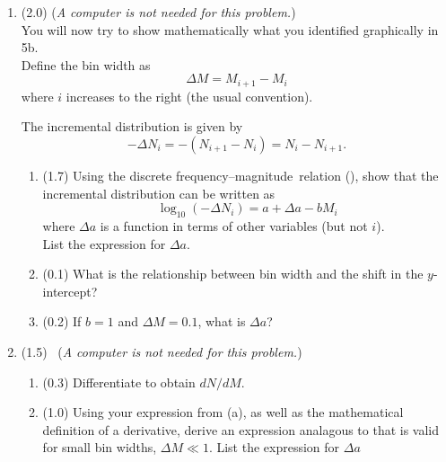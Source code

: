 \documentclass[11pt,titlepage,fleqn]{article}
\newcommand{\fmag}{frequency--magnitude}
\begin{document}
\begin{enumerate}

\pagebreak
\item (2.0) ({\em A computer is not needed for this problem.}) \\
You will now try to show mathematically what you identified graphically in 5b. \\
Define the bin width as
%
\begin{equation}
\Delta M = M_{i+1} - M_i
\label{dM}
\end{equation}
%
where $i$ increases to the right (the usual convention).

The incremental distribution is given by
%
\begin{equation}
-\Delta N_i = -(N_{i+1} - N_i) = N_i - N_{i+1}.
\end{equation}
%
\begin{enumerate}
\item (1.7) Using the discrete \fmag\ relation (), show that the incremental distribution can be written as
%
\begin{equation}
\log_{10}(-\Delta N_i) = a + \Delta a - b M_i
\label{inc}
\end{equation}
%
where $\Delta a$ is a function in terms of other variables (but not $i$). \\
List the expression for $\Delta a$.


\item (0.1) What is the relationship between bin width and the shift in the $y$-intercept?

\item (0.2) If $b = 1$ and $\Delta M = 0.1$, what is $\Delta a$?
\end{enumerate}


\item  (1.5) \ptag\ ({\em A computer is not needed for this problem.})
%
\begin{enumerate}
\item (0.3) Differentiate  to obtain $d N/ d M$.


\item (1.0) Using your expression from (a), as well as the mathematical definition of a derivative, derive an expression analagous to  that is valid for small bin widths, $\Delta M \ll 1$. List the expression for $\Delta a$


\end{enumerate}
\end{enumerate}
\end{document}
